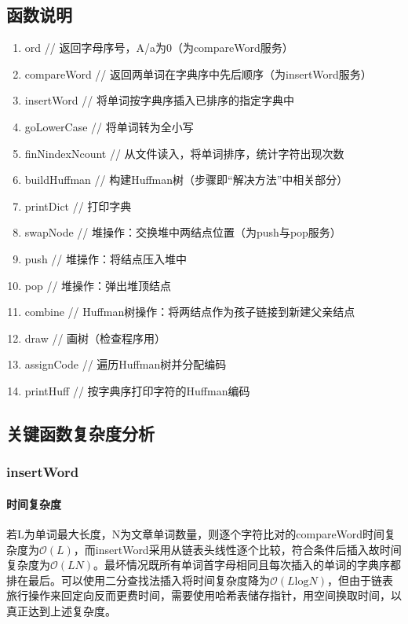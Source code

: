 \documentclass{homework}
\begin{document}
\subsection{函数说明}
\begin{enumerate}
    \item ord // 返回字母序号，A/a为0（为compareWord服务）
    \item compareWord // 返回两单词在字典序中先后顺序（为insertWord服务）
    \item insertWord // 将单词按字典序插入已排序的指定字典中
    \item goLowerCase // 将单词转为全小写
    \item finNindexNcount // 从文件读入，将单词排序，统计字符出现次数
    \item buildHuffman // 构建Huffman树（步骤即“解决方法”中相关部分）
    \item printDict // 打印字典
    \item swapNode // 堆操作：交换堆中两结点位置（为push与pop服务）
    \item push // 堆操作：将结点压入堆中
    \item pop // 堆操作：弹出堆顶结点
    \item combine // Huffman树操作：将两结点作为孩子链接到新建父亲结点
    \item draw // 画树（检查程序用）
    \item assignCode // 遍历Huffman树并分配编码
    \item printHuff // 按字典序打印字符的Huffman编码
\end{enumerate}
\subsection{关键函数复杂度分析}
    \subsubsection{insertWord}
    \paragraph{时间复杂度}若L为单词最大长度，N为文章单词数量，则逐个字符比对的compareWord时间复杂度为$\mathcal{O}(L)$，而insertWord采用从链表头线性逐个比较，符合条件后插入故时间复杂度为$\mathcal{O}(LN)$。最坏情况既所有单词首字母相同且每次插入的单词的字典序都排在最后。可以使用二分查找法插入将时间复杂度降为$\mathcal{O}(L\mathrm{log}N)$，但由于链表旅行操作来回定向反而更费时间，需要使用哈希表储存指针，用空间换取时间，以真正达到上述复杂度。
\end{document}
